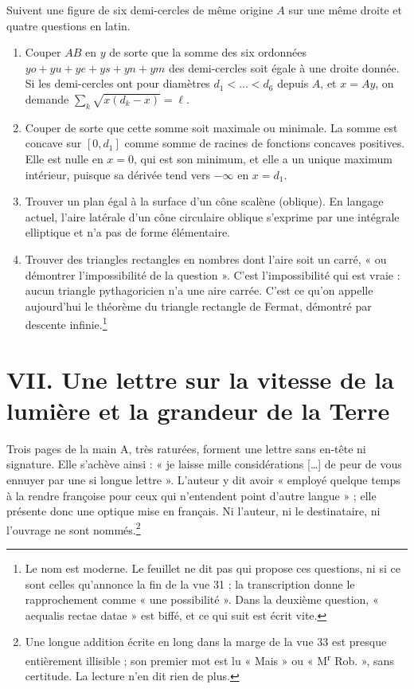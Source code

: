 \documentclass[11pt,a4paper]{article}
\begin{document}
Suivent une figure de six demi-cercles de même origine \(A\) sur une même
droite et quatre questions en latin.
\begin{enumerate}
  \item Couper \(AB\) en \(y\) de sorte que la somme des six ordonnées
    \(yo+yu+ye+ys+yn+ym\) des demi-cercles soit égale à une droite donnée.
    Si les demi-cercles ont pour diamètres \(d_1<\dots<d_6\) depuis \(A\), et
    \(x=Ay\), on demande \(\sum_k\sqrt{x(d_k-x)}=\ell\).
  \item Couper de sorte que cette somme soit maximale ou minimale. La somme est
    concave sur \([0,d_1]\) comme somme de racines de fonctions concaves
    positives. Elle est nulle en \(x=0\), qui est son minimum, et elle a un
    unique maximum intérieur, puisque sa dérivée tend vers \(-\infty\) en
    \(x=d_1\).
  \item Trouver un plan égal à la surface d'un cône scalène (oblique). En
    langage actuel, l'aire latérale d'un cône circulaire oblique s'exprime par
    une intégrale elliptique et n'a pas de forme élémentaire.
  \item Trouver des triangles rectangles en nombres dont l'aire soit un carré,
    « ou démontrer l'impossibilité de la question ». C'est l'impossibilité qui
    est vraie : aucun triangle pythagoricien n'a une aire carrée. C'est ce qu'on
    appelle aujourd'hui le théorème du triangle rectangle de Fermat, démontré
    par descente infinie.\footnote{Le nom est moderne. Le feuillet ne dit pas
    qui propose ces questions, ni si ce sont celles qu'annonce la fin de la vue
    31 ; la transcription donne le rapprochement comme « une possibilité ».
    Dans la deuxième question, « aequalis rectae datae » est biffé, et ce qui
    suit est écrit vite.}
\end{enumerate}

\section*{VII. Une lettre sur la vitesse de la lumière et la grandeur de la Terre}

Trois pages de la main A, très raturées, forment une lettre sans en-tête ni
signature. Elle s'achève ainsi : « je laisse mille considérations […] de peur de
vous ennuyer par une si longue lettre ». L'auteur y dit avoir « employé quelque
temps à la rendre françoise pour ceux qui n'entendent point d'autre langue » ;
elle présente donc une optique mise en français. Ni l'auteur, ni le
destinataire, ni l'ouvrage ne sont nommés.\footnote{Une longue addition écrite
en long dans la marge de la vue 33 est presque entièrement illisible ; son
premier mot est lu « Mais » ou « M\textsuperscript{r} Rob. », sans certitude.
La lecture n'en dit rien de plus.}
\end{document}
